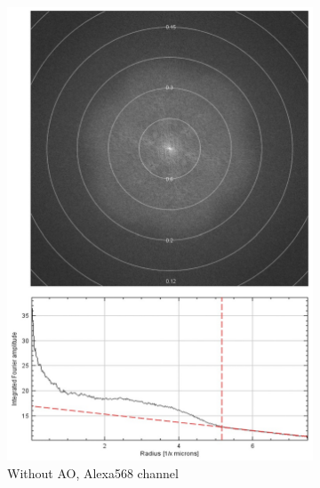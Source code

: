 \begin{figure}
	\begin{subfigure}[t]{0.45\textwidth}
		\centering
		\includegraphics[width=\linewidth]{images/DeepSIM_NMJ_woAO_Alexa568_ft_and_plot.jpg}
		\caption{Without AO, Alexa568 channel}
		\label{fig:DeepSIM_NMJ_woAO_Alexa568_ft_and_plot}
	\end{subfigure}
	\begin{subfigure}[t]{0.45\textwidth}
		\centering

\end{subfigure}
\end{figure}
